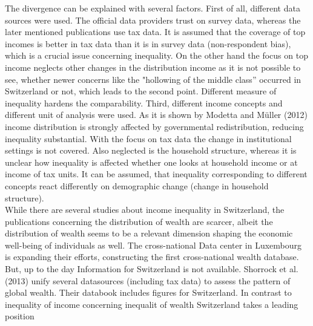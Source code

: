 \documentclass[twoside]{article}
\begin{document}
\begin{multicols}{2}

The divergence can be explained with several factors. First of all, different data sources were used. The official data providers trust on survey data, whereas the later mentioned publications use tax data. It is assumed that the coverage of top incomes is better in tax data than it is in survey data (non-respondent bias), which is a crucial issue concerning inequality. On the other hand the focus on top income neglects other changes in the distribution income as it is not possible to see, whether newer concerns like the "hollowing of the middle class'' occurred in Switzerland or not, which leads to the second point. Different measure of inequality hardens the comparability. Third, different income concepts and different unit of analysis were used. As it is shown by Modetta and Müller (2012) income distribution is strongly affected by governmental redistribution, reducing inequality substantial. With the focus on tax data the change in institutional settings is not covered. Also neglected is the household structure, whereas it is unclear how inequality is affected whether one looks at household income or at income of tax units. It can be assumed, that inequality corresponding to different concepts react differently on demographic change (change in household structure). \\


While there are several studies about income inequality in Switzerland, the publications concerning the distribution of wealth are scarcer, albeit the distribution of wealth seems to be a relevant dimension shaping the economic well-being of individuals as well. The cross-national Data center in Luxembourg is expanding their efforts, constructing the first cross-national wealth database. But, up to the day Information for Switzerland is not available. Shorrock et al. (2013) unify several datasources (including tax data) to assess the pattern of global wealth. Their databook includes figures for Switzerland. In contrast to inequality of income concerning inequalit of wealth Switzerland takes a leading position \\



\end{multicols}
\end{document}
